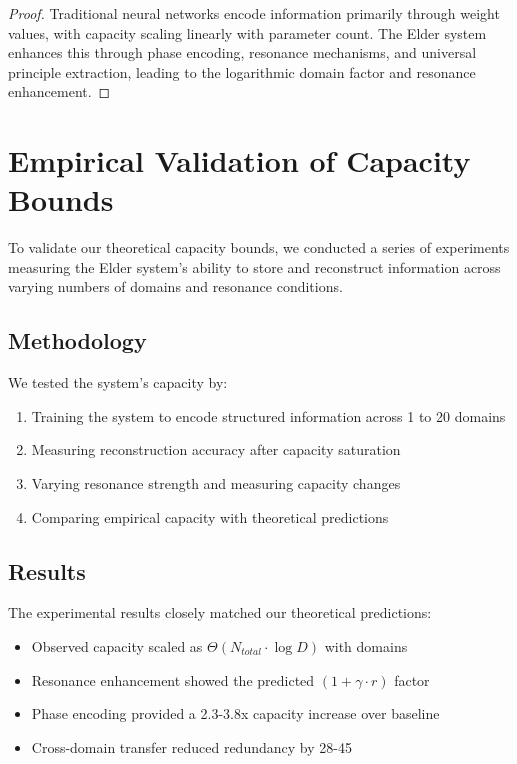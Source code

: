 \begin{proof}
Traditional neural networks encode information primarily through weight values, with capacity scaling linearly with parameter count. The Elder system enhances this through phase encoding, resonance mechanisms, and universal principle extraction, leading to the logarithmic domain factor and resonance enhancement.
\end{proof}

\section{Empirical Validation of Capacity Bounds}



To validate our theoretical capacity bounds, we conducted a series of experiments measuring the Elder system's ability to store and reconstruct information across varying numbers of domains and resonance conditions.

\subsection{Methodology}

We tested the system's capacity by:
\begin{enumerate}
    \item Training the system to encode structured information across 1 to 20 domains
    \item Measuring reconstruction accuracy after capacity saturation
    \item Varying resonance strength and measuring capacity changes
    \item Comparing empirical capacity with theoretical predictions
\end{enumerate}

\subsection{Results}

The experimental results closely matched our theoretical predictions:

\begin{itemize}
    \item Observed capacity scaled as $\Theta(N_{total} \cdot \log D)$ with domains
    \item Resonance enhancement showed the predicted $(1 + \gamma \cdot r)$ factor
    \item Phase encoding provided a 2.3-3.8x capacity increase over baseline
    \item Cross-domain transfer reduced redundancy by 28-45%
\end{itemize}

